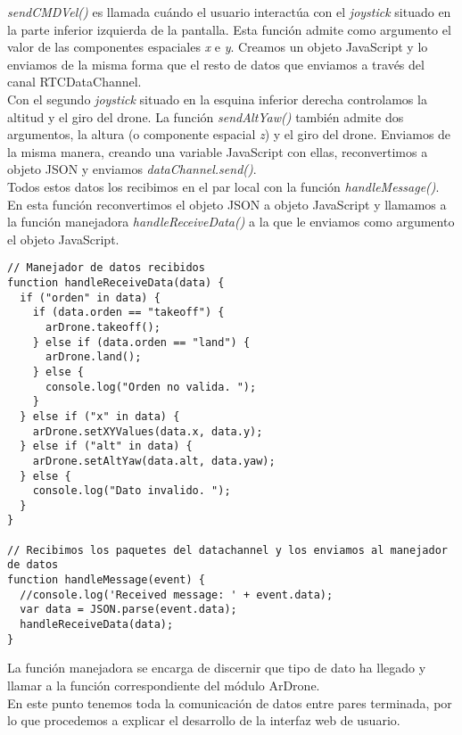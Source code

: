 \emph{sendCMDVel()} es llamada cuándo el usuario interactúa con el \emph{joystick} situado en la parte inferior izquierda de la pantalla. Esta función admite como argumento el valor de las componentes espaciales \emph{x} e \emph{y}. Creamos un objeto JavaScript y lo enviamos de la misma forma que el resto de datos que enviamos a través del canal RTCDataChannel.\\

Con el segundo \emph{joystick} situado en la esquina inferior derecha controlamos la altitud y el giro del drone. La función \emph{sendAltYaw()} también admite dos argumentos, la altura (o componente espacial \emph{z}) y el giro del drone. Enviamos de la misma manera, creando una variable JavaScript con ellas, reconvertimos a objeto JSON y enviamos \emph{dataChannel.send()}.\\

Todos estos datos los recibimos en el par local con la función \emph{handleMessage()}. En esta función reconvertimos el objeto JSON a objeto JavaScript y llamamos a la función manejadora \emph{handleReceiveData()} a la que le enviamos como argumento el objeto JavaScript.\\

\begin{lstlisting}[caption=Manejo de las órdenes recibidas en el par local.]
// Manejador de datos recibidos 
function handleReceiveData(data) {
  if ("orden" in data) {
    if (data.orden == "takeoff") {
      arDrone.takeoff();
    } else if (data.orden == "land") {
      arDrone.land();
    } else {
      console.log("Orden no valida. ");
    }
  } else if ("x" in data) {
    arDrone.setXYValues(data.x, data.y);
  } else if ("alt" in data) {
    arDrone.setAltYaw(data.alt, data.yaw);
  } else {
    console.log("Dato invalido. ");
  }		
}

// Recibimos los paquetes del datachannel y los enviamos al manejador de datos
function handleMessage(event) {
  //console.log('Received message: ' + event.data);
  var data = JSON.parse(event.data);
  handleReceiveData(data);
}
\end{lstlisting}


La función manejadora se encarga de discernir que tipo de dato ha llegado y llamar a la función correspondiente del módulo ArDrone.\\

En este punto tenemos toda la comunicación de datos entre pares terminada, por lo que procedemos a explicar el desarrollo de la interfaz web de usuario.\\

